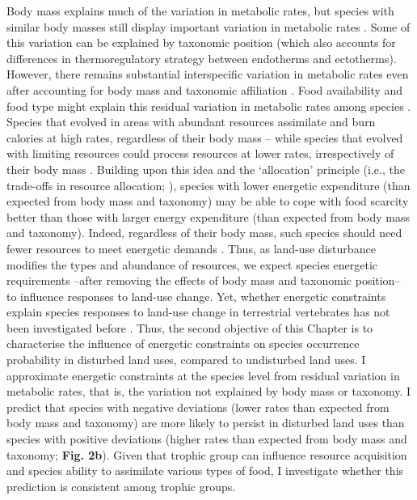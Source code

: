 Body mass explains much of the variation in metabolic rates, but species with similar body masses still display important variation in metabolic rates \citep{Mueller2001}. Some of this variation can be explained by taxonomic position (which also accounts for differences in thermoregulatory strategy between endotherms and ectotherms). However, there remains substantial interspecific variation in metabolic rates even after accounting for body mass and taxonomic affiliation \citep{Mueller2001, White2013}. Food availability and food type might explain this residual variation in metabolic rates among species \citep{Mueller2001}. Species that evolved in areas with abundant resources assimilate and burn calories at high rates, regardless of their body mass -- while species that evolved with limiting resources could process resources at lower rates, irrespectively of their body mass \citep{Mueller2001}. Building upon this idea and the `allocation' principle (i.e., the trade-offs in resource allocation; \citet{Auer2020}), species with lower energetic expenditure (than expected from body mass and taxonomy) may be able to cope with food scarcity better than those with larger energy expenditure (than expected from body mass and taxonomy). Indeed, regardless of their body mass, such species should need fewer resources to meet energetic demands \citep{Clarke2004a}. Thus, as land-use disturbance modifies the types and abundance of resources, we expect species energetic requirements --after removing the effects of body mass and taxonomic position-- to influence responses to land-use change. Yet, whether energetic constraints explain species responses to land-use change in terrestrial vertebrates has not been investigated before \citep{Hevia2017}. Thus, the second objective of this Chapter is to characterise the influence of energetic constraints on species occurrence probability in disturbed land uses, compared to undisturbed land uses. I approximate energetic constraints at the species level from residual variation in metabolic rates, that is, the variation not explained by body mass or taxonomy. I predict that species with negative deviations (lower rates than expected from body mass and taxonomy) are more likely to persist in disturbed land uses than species with positive deviations (higher rates than expected from body mass and taxonomy; \textbf{Fig. 2b}). Given that trophic group can influence resource acquisition and species ability to assimilate various types of food, I investigate whether this prediction is consistent among trophic groups.

